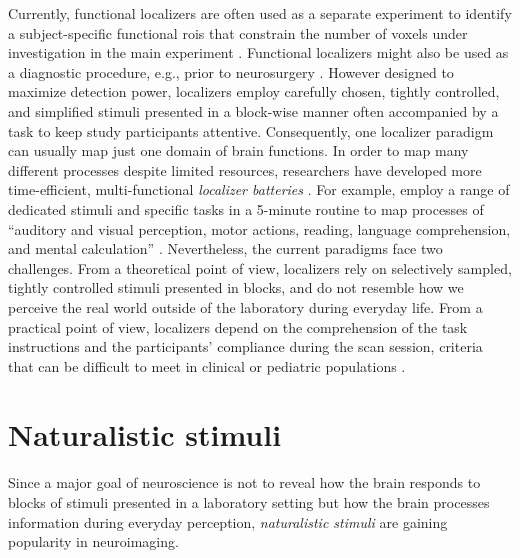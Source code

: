 Currently, functional localizers are often used as a separate experiment to
identify a subject-specific functional \acp{roi} that constrain the number of
voxels under investigation in the main experiment \citep{poldrack2007region,
saxe2006divide}.
Functional localizers might also be used as a diagnostic procedure, e.g., prior
to neurosurgery \citep[cf.][]{silva2018challenges, szaflarski2017practice}.
However designed to maximize detection power, localizers employ carefully
chosen, tightly controlled, and simplified stimuli presented in a block-wise
manner often accompanied by a task to keep study participants attentive.
Consequently, one localizer paradigm can usually map just one domain of brain
functions.
In order to map many different processes despite limited resources, researchers
have developed more time-efficient, multi-functional \textit{localizer
batteries} \citep[e.g.,][]{barch2013function, drobyshevsky2006rapid,
pinho2018individual, pinho2020individual, pinel2007fast}.
For example, \citet{pinel2007fast} employ a range of dedicated stimuli and
specific tasks in a 5-minute routine to map processes of ``auditory and visual
perception, motor actions, reading, language comprehension, and mental
calculation'' \citep{pinel2007fast}.
Nevertheless, the current paradigms face two challenges.
From a theoretical point of view, localizers rely on selectively sampled,
tightly controlled stimuli presented in blocks, and do not resemble how we
perceive the real world outside of the laboratory during everyday life.
From a practical point of view, localizers depend on the comprehension of the
task instructions and the participants' compliance during the scan session,
criteria that can be difficult to meet in clinical or pediatric populations
\citep{eickhoff2020towards, vanderwal2015inscapes, vanderwal2019movies}.


\section{Naturalistic stimuli}
Since a major goal of neuroscience is not to reveal how the brain responds to
blocks of stimuli presented in a laboratory setting but how the brain processes
information during everyday perception, \textit{naturalistic stimuli} are
gaining popularity in neuroimaging.

